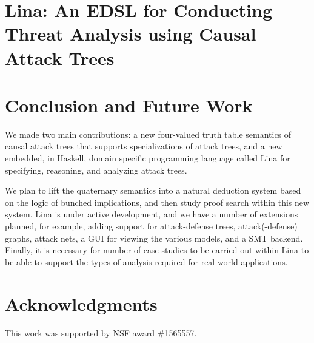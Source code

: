 \documentclass{llncs}
\begin{document}

\vspace{-7px}
\section{Lina: An EDSL for Conducting Threat Analysis using Causal Attack Trees}
\label{sec:lina:_an_edsl_for_conducting_threat_analysis_using_causal_attack_trees}


\vspace{-7px}
\section{Conclusion and Future Work}
\label{sec:conclusion}
We made two main contributions: a new four-valued truth table
semantics of causal attack trees that supports specializations of
attack trees, and a new embedded, in Haskell, domain specific
programming language called Lina for specifying, reasoning, and
analyzing attack trees.

We plan to lift the quaternary semantics into a natural deduction
system based on the logic of bunched implications, and then study
proof search within this new system.  Lina is under active
development, and we have a number of extensions planned, for example,
adding support for attack-defense trees, attack(-defense) graphs,
attack nets, a GUI for viewing the various models, and a SMT backend.
Finally, it is necessary for number of case studies to be carried out
within Lina to be able to support the types of analysis required for
real world applications.  

\vspace{-7px}
\section{Acknowledgments}
\label{sec:acknowledgments}
This work was supported by NSF award \#1565557.





\appendix
\end{document}
